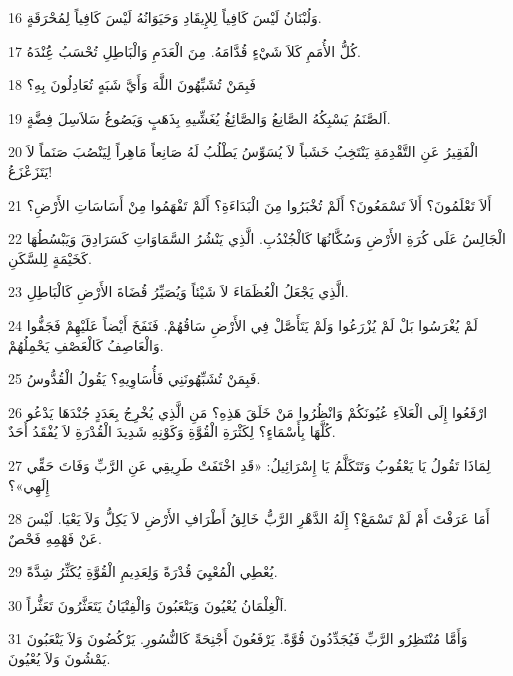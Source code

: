 \par 16 وَلُبْنَانُ لَيْسَ كَافِياً لِلإِيقَادِ وَحَيَوَانُهُ لَيْسَ كَافِياً لِمُحْرَقَةٍ.
\par 17 كُلُّ الأُمَمِ كَلاَ شَيْءٍ قُدَّامَهُ. مِنَ الْعَدَمِ وَالْبَاطِلِ تُحْسَبُ عَُِنْدَهُ.
\par 18 فَبِمَنْ تُشَبِّهُونَ اللَّهَ وَأَيَّ شَبَهٍ تُعَادِلُونَ بِهِ؟
\par 19 اَلصَّنَمُ يَسْبِكُهُ الصَّانِعُ وَالصَّائِغُ يُغَشِّيهِ بِذَهَبٍ وَيَصُوغُ سَلاَسِلَ فِضَّةٍ.
\par 20 الْفَقِيرُ عَنِ التَّقْدِمَةِ يَنْتَخِبُ خَشَباً لاَ يُسَوِّسُ يَطْلُبُ لَهُ صَانِعاً مَاهِراً لِيَنْصُبَ صَنَماً لاَ يَتَزَعْزَعُ!
\par 21 أَلاَ تَعْلَمُونَ؟ أَلاَ تَسْمَعُونَ؟ أَلَمْ تُخْبَرُوا مِنَ الْبَدَاءَةِ؟ أَلَمْ تَفْهَمُوا مِنْ أَسَاسَاتِ الأَرْضِ؟
\par 22 الْجَالِسُ عَلَى كُرَةِ الأَرْضِ وَسُكَّانُهَا كَالْجُنْدُبِ. الَّذِي يَنْشُرُ السَّمَاوَاتِ كَسَرَادِقَ وَيَبْسُطُهَا كَخَيْمَةٍ لِلسَّكَنِ.
\par 23 الَّذِي يَجْعَلُ الْعُظَمَاءَ لاَ شَيْئاً وَيُصَيِّرُ قُضَاةَ الأَرْضِ كَالْبَاطِلِ.
\par 24 لَمْ يُغْرَسُوا بَلْ لَمْ يُزْرَعُوا وَلَمْ يَتَأَصَّلْ فِي الأَرْضِ سَاقُهُمْ. فَنَفَخَ أَيْضاً عَلَيْهِمْ فَجَفُّوا وَالْعَاصِفُ كَالْعَصْفِ يَحْمِلُهُمْ.
\par 25 فَبِمَنْ تُشَبِّهُونَنِي فَأُسَاوِيهِ؟ يَقُولُ الْقُدُّوسُ.
\par 26 ارْفَعُوا إِلَى الْعَلاَءِ عُيُونَكُمْ وَانْظُرُوا مَنْ خَلَقَ هَذِهِ؟ مَنِ الَّذِي يُخْرِجُ بِعَدَدٍ جُنْدَهَا يَدْعُو كُلَّهَا بِأَسْمَاءٍ؟ لِكَثْرَةِ الْقُوَّةِ وَكَوْنِهِ شَدِيدَ الْقُدْرَةِ لاَ يُفْقَدُ أَحَدٌ.
\par 27 لِمَاذَا تَقُولُ يَا يَعْقُوبُ وَتَتَكَلَّمُ يَا إِسْرَائِيلُ: «قَدِ اخْتَفَتْ طَرِيقِي عَنِ الرَّبِّ وَفَاتَ حَقِّي إِلَهِي»؟
\par 28 أَمَا عَرَفْتَ أَمْ لَمْ تَسْمَعْ؟ إِلَهُ الدَّهْرِ الرَّبُّ خَالِقُ أَطْرَافِ الأَرْضِ لاَ يَكِلُّ وَلاَ يَعْيَا. لَيْسَ عَنْ فَهْمِهِ فَحْصٌ.
\par 29 يُعْطِي الْمُعْيِيَ قُدْرَةً وَلِعَدِيمِ الْقُوَّةِ يُكَثِّرُ شِدَّةً.
\par 30 اَلْغِلْمَانُ يُعْيُونَ وَيَتْعَبُونَ وَالْفِتْيَانُ يَتَعَثَّرُونَ تَعَثُّراً.
\par 31 وَأَمَّا مُنْتَظِرُو الرَّبِّ فَيُجَدِّدُونَ قُوَّةً. يَرْفَعُونَ أَجْنِحَةً كَالنُّسُورِ. يَرْكُضُونَ وَلاَ يَتْعَبُونَ يَمْشُونَ وَلاَ يُعْيُونَ.

